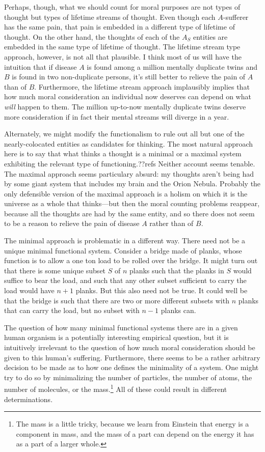 Perhaps, though, what we should count for moral purposes are not types of thought but types of lifetime streams of thought.
Even though each $A$-sufferer has the same pain, that pain is embedded in a different type of lifetime of thought. On the other 
hand, the thoughts of each of the $A_S$ entities are embedded in the same type of lifetime of thought. The lifetime stream type
approach, however, is not all that plausible. I think most of us will have the intuition that if disease $A$ is found among
a million mentally duplicate twins and $B$ is found in two non-duplicate persons, it's still better to relieve the pain of $A$ than of $B$. 
Furthermore, the lifetime stream approach implausibly implies that how much moral consideration an individual now deserves can depend on what 
\textit{will} happen to them. The million up-to-now mentally duplicate twins deserve more consideration if in fact
their mental streams will diverge in a year.

Alternately, we might modify the functionalism to rule out all but one of the nearly-colocated entities as candidates for
thinking. The most natural approach here is to say that what thinks a thought is a minimal or a maximal system exhibiting 
the relevant type of functioning.??refs Neither account seems tenable. The maximal approach seems particulary absurd: my thoughts aren't 
being had by some giant system that includes my brain and the Orion Nebula. Probably the only defensible version of the maximal
approach is a holism on which it is the universe as a whole that thinks---but then the moral counting problems reappear, because
all the thoughts are had by the same entity, and so there does not seem to be a reason to relieve the pain of disease $A$ rather 
than of $B$. 

The minimal approach is problematic in a different way. There need not be a unique minimal functional 
system. Consider a bridge made of planks, whose function is to allow a one ton load to be rolled over the bridge. 
It might turn out that there is some unique subset $S$ of $n$ planks such that the planks in $S$ would suffice to 
bear the load, and such that any other subset sufficient to carry the load would have $n+1$ planks. But this also 
need not be true. It could well be that the bridge is such that there are two or more different subsets with $n$ 
planks that can carry the load, but no subset with $n-1$ planks can.

The question of how many minimal functional systems there are in a given human organism is a potentially interesting
empirical question, but it is intuitively irrelevant to the question of how much moral consideration should be given 
to this human's suffering. Furthermore, there seems to be a rather arbitrary decision to be made as to how one 
defines the minimality of a system. One might try to do so by minimalizing the number of particles, the number of atoms, the number of 
molecules, or the mass.\footnote{The mass is a little tricky, because we learn from Einstein that energy is a component in mass,
and the mass of a part can depend on the energy it has as a part of a larger whole.} All of these could result in 
different determinations.

